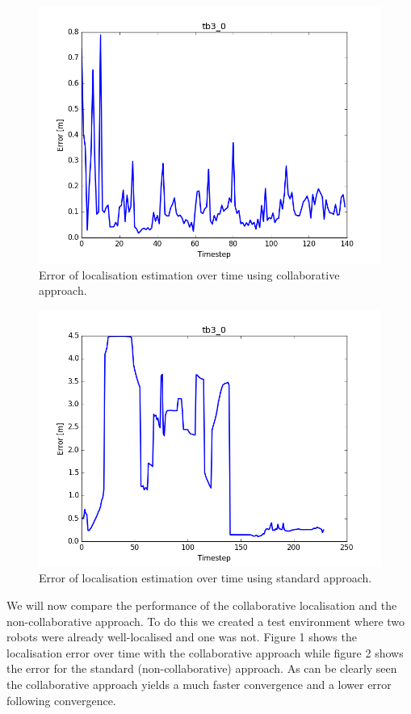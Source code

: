 \documentclass[10pt,a4paper]{article}
\begin{document}
\begin{figure}
	\centering
	\includegraphics[width=\columnwidth]{figure_l1.png}
	\caption{Error of localisation estimation over time using collaborative approach.}
\end{figure}
\begin{figure}
	\includegraphics[width=\columnwidth]{figure_l2.png}
	\caption{Error of localisation estimation over time using standard approach.}
\end{figure}

We will now compare the performance of the collaborative localisation and the non-collaborative approach. To do this we created a test environment where two robots were already well-localised and one was not. Figure 1 shows the localisation error over time with the collaborative approach while figure 2 shows the error for the standard (non-collaborative) approach. As can be clearly seen the collaborative approach yields a much faster convergence and a lower error following convergence.
\end{document}

